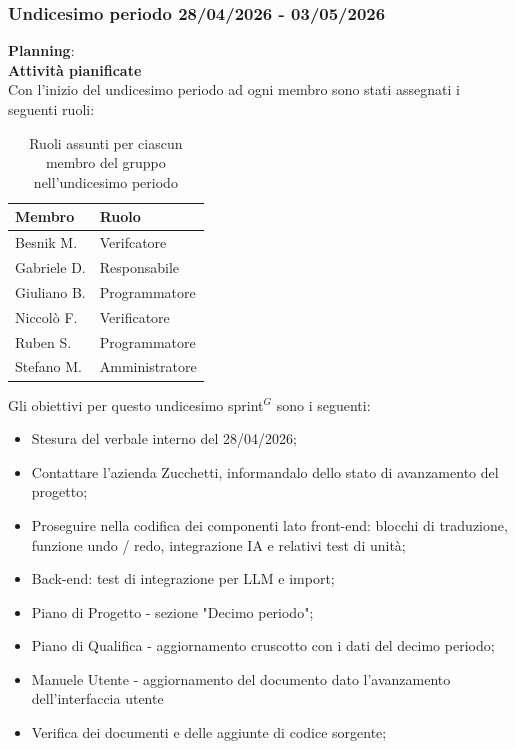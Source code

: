 \documentclass[a4paper,10pt]{article}
\begin{document}
\subsubsection{Undicesimo periodo 28/04/2026 - 03/05/2026}
\textbf{Planning}: \\
\textbf{Attività pianificate} \\ Con l'inizio del undicesimo periodo ad ogni membro sono stati assegnati i seguenti ruoli:
\begin{table}[H]
\centering
\begin{tabular}{|l|l|}
\hline
\textbf{Membro} & \textbf{Ruolo} \\
\hline
Besnik M.  & Verifcatore \\
\hline
Gabriele D.  & Responsabile \\
\hline
Giuliano B. & Programmatore \\
\hline
Niccolò F. & Verificatore \\
\hline
Ruben S. & Programmatore \\
\hline
Stefano M.  & Amministratore \\
\hline
\end{tabular}
\caption{Ruoli assunti per ciascun membro del gruppo nell'undicesimo periodo}
\end{table}

Gli obiettivi per questo undicesimo sprint$^G$ sono i seguenti:
\begin{itemize}
  \item Stesura del verbale interno del 28/04/2026;
  \item Contattare l'azienda Zucchetti, informandalo dello stato di avanzamento del progetto;
  \item Proseguire nella codifica dei componenti lato front-end: blocchi di traduzione, funzione undo / redo, integrazione IA e relativi test di unità;
  \item Back-end: test di integrazione per LLM e import;
  \item Piano di Progetto - sezione "Decimo periodo";
  \item Piano di Qualifica - aggiornamento cruscotto con i dati del decimo periodo;
  \item Manuele Utente - aggiornamento del documento dato l'avanzamento dell'interfaccia utente
  \item Verifica dei documenti e delle aggiunte di codice sorgente;
\end{itemize}
\end{document}
